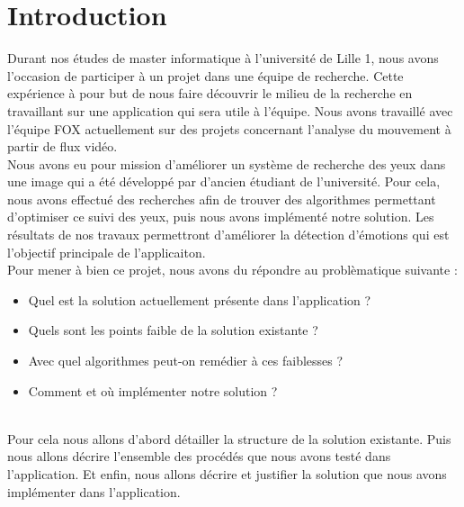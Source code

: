 \section*{Introduction}
Durant nos études de master informatique à l'université de Lille 1, nous avons l'occasion de participer à un projet
dans une équipe de recherche. Cette expérience à pour but de nous faire découvrir le milieu de la recherche en travaillant
sur une application qui sera utile à l'équipe. Nous avons travaillé avec l'équipe FOX actuellement sur des projets
concernant l'analyse du mouvement à partir de flux vidéo.\\

Nous avons eu pour mission d'améliorer un système de recherche des yeux dans une image qui a été développé 
par d'ancien étudiant de l'université. Pour cela, nous avons effectué des recherches afin de trouver des 
algorithmes permettant d'optimiser ce suivi des yeux, puis nous avons implémenté notre solution.
Les résultats de nos travaux permettront d'améliorer la détection d'émotions qui est l'objectif principale 
de l'applicaiton.\\

Pour mener à bien ce projet, nous avons du répondre au problèmatique suivante :
\begin{itemize}
 \item Quel est la solution actuellement présente dans l'application ?
 \item Quels sont les points faible de la solution existante ?
 \item Avec quel algorithmes peut-on remédier à ces faiblesses ?
 \item Comment et où implémenter notre solution ?
\end{itemize}

\ \\
Pour cela nous allons d'abord détailler la structure de la solution existante. Puis nous allons 
décrire l'ensemble des procédés que nous avons testé dans l'application. Et enfin, nous allons
décrire et justifier la solution que nous avons implémenter dans l'application.
\newpage